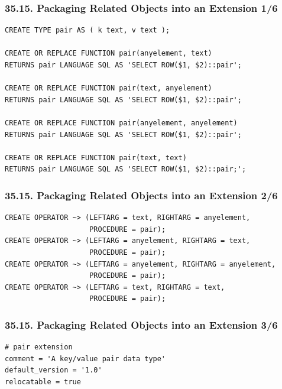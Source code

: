 \documentclass[english]{beamer}
\begin{document}
\begin{frame}[fragile]
  \frametitle{35.15. Packaging Related Objects into an Extension 1/6}

\begin{example}
\begin{verbatim}
CREATE TYPE pair AS ( k text, v text );

CREATE OR REPLACE FUNCTION pair(anyelement, text)
RETURNS pair LANGUAGE SQL AS 'SELECT ROW($1, $2)::pair';

CREATE OR REPLACE FUNCTION pair(text, anyelement)
RETURNS pair LANGUAGE SQL AS 'SELECT ROW($1, $2)::pair';

CREATE OR REPLACE FUNCTION pair(anyelement, anyelement)
RETURNS pair LANGUAGE SQL AS 'SELECT ROW($1, $2)::pair';

CREATE OR REPLACE FUNCTION pair(text, text)
RETURNS pair LANGUAGE SQL AS 'SELECT ROW($1, $2)::pair;';  
\end{verbatim}
\end{example}
\end{frame}

\begin{frame}[fragile]
  \frametitle{35.15. Packaging Related Objects into an Extension 2/6}

\begin{example}
\begin{verbatim}
CREATE OPERATOR ~> (LEFTARG = text, RIGHTARG = anyelement,
                    PROCEDURE = pair);
CREATE OPERATOR ~> (LEFTARG = anyelement, RIGHTARG = text,
                    PROCEDURE = pair);
CREATE OPERATOR ~> (LEFTARG = anyelement, RIGHTARG = anyelement,
                    PROCEDURE = pair);
CREATE OPERATOR ~> (LEFTARG = text, RIGHTARG = text,
                    PROCEDURE = pair);
\end{verbatim}
\end{example}
\end{frame}

\begin{frame}[fragile]
  \frametitle{35.15. Packaging Related Objects into an Extension 3/6}

\begin{example}
\begin{verbatim}
# pair extension
comment = 'A key/value pair data type'
default_version = '1.0'
relocatable = true
\end{verbatim}
\end{example}
\end{frame}
\end{document}
